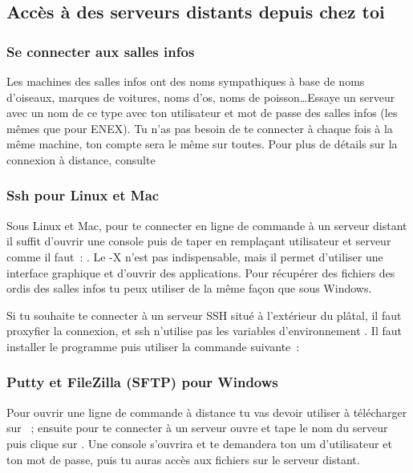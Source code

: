 \subsection{Accès à des serveurs distants depuis chez toi}

\subsubsection{Se connecter aux salles infos}

Les machines des salles infos ont des noms sympathiques à base de noms d'oiseaux, marques de voitures, noms d'os, noms de poisson\dots Essaye un serveur avec un nom de ce type avec ton utilisateur et mot de passe des salles infos (les mêmes que pour ENEX). Tu n'as pas besoin de te connecter à chaque fois à la même machine, ton compte sera le même sur toutes. Pour plus de détails sur la connexion à distance, consulte \newline {}



\subsubsection{Ssh pour Linux et Mac}

Sous Linux et Mac, pour te connecter en ligne de commande à un serveur distant il suffit d'ouvrir une console puis de taper en remplaçant utilisateur et serveur comme il faut~: . Le -X n'est pas indispensable, mais il permet d'utiliser une interface graphique et d'ouvrir des applications. Pour récupérer des fichiers des ordis des salles infos tu peux utiliser  de la même façon que sous Windows.

Si tu souhaite te connecter à un serveur SSH situé à l'extérieur du plâtal, il faut proxyfier la connexion, et ssh n'utilise pas les variables d'environnement . Il faut installer le programme  puis utiliser la commande suivante~:

\newpage
\subsubsection{Putty et FileZilla (SFTP) pour Windows}

Pour ouvrir une ligne de commande à distance tu vas devoir utiliser  à télécharger sur ~;
ensuite pour te connecter à un serveur ouvre  et tape le nom du serveur puis clique sur .
Une console s'ouvrira et te demandera ton um d'utilisateur et ton mot de passe, puis tu auras accès aux fichiers sur le serveur distant.

